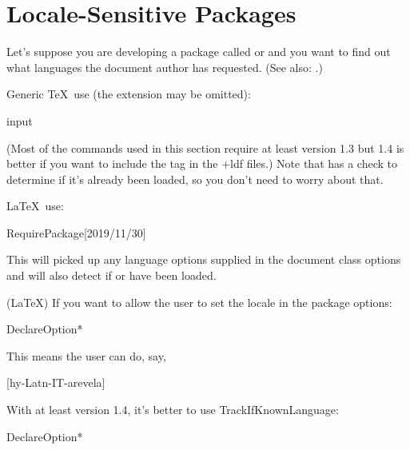 \documentclass[titlepage=false,oneside,
 fontsize=12pt,captions=tableheading]{scrbook}
\begin{document}
\section{Locale-Sensitive Packages}
\label{sec:summary-localepkg}

Let's suppose you are developing a package called 
 or  and you want
to find out what languages the document author has requested. (See also:
.)

Generic \TeX\ use (the  extension may be omitted):
\begin{codebox*}
\gls{input} 
\end{codebox*}
(Most of the commands used in this section require at least
 version 1.3 but 1.4 is better if you want to
include the  tag in the \ext+{ldf} files.)
Note that  has a check to determine if
it's already been loaded, so you don't need to worry about that.

\LaTeX\ use:
\begin{codebox*}
\gls{RequirePackage}[2019/11/30]
\end{codebox*}
This will picked up any language options supplied in the document
class options and will also detect if  or
 have been loaded.

(\LaTeX) If you want to allow the user to set the locale in the 
package options:
\begin{codebox*}
\gls{DeclareOption}*
\end{codebox*}
This means the user can do, say,
\begin{codebox}
[hy-Latn-IT-arevela]
\end{codebox}
With at least version 1.4, it's better to use \gls{TrackIfKnownLanguage}:
\begin{codebox}
\gls{DeclareOption}*
\end{codebox}
\end{document}
